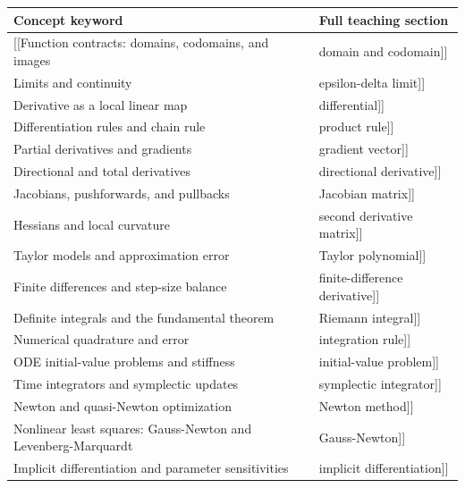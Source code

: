 {\def\LTcaptype{none} %
\begin{longtable}[]{@{}
  >{\raggedright\arraybackslash}p{}
  >{\raggedright\arraybackslash}p{}@{}}
\toprule\noalign{}
\begin{minipage}[b]{\linewidth}\raggedright
Concept keyword
\end{minipage} & \begin{minipage}[b]{\linewidth}\raggedright
Full teaching section
\end{minipage} \\
\midrule\noalign{}
\endhead
\bottomrule\noalign{}
\endlastfoot
{[}{[}Function contracts: domains, codomains, and images & domain and codomain{]}{]} \\
{[}{[}Limits and continuity & epsilon-delta limit{]}{]} \\
{[}{[}Derivative as a local linear map & differential{]}{]} \\
{[}{[}Differentiation rules and chain rule & product rule{]}{]} \\
{[}{[}Partial derivatives and gradients & gradient vector{]}{]} \\
{[}{[}Directional and total derivatives & directional derivative{]}{]} \\
{[}{[}Jacobians, pushforwards, and pullbacks & Jacobian matrix{]}{]} \\
{[}{[}Hessians and local curvature & second derivative matrix{]}{]} \\
{[}{[}Taylor models and approximation error & Taylor polynomial{]}{]} \\
{[}{[}Finite differences and step-size balance & finite-difference derivative{]}{]} \\
{[}{[}Definite integrals and the fundamental theorem & Riemann integral{]}{]} \\
{[}{[}Numerical quadrature and error & integration rule{]}{]} \\
{[}{[}ODE initial-value problems and stiffness & initial-value problem{]}{]} \\
{[}{[}Time integrators and symplectic updates & symplectic integrator{]}{]} \\
{[}{[}Newton and quasi-Newton optimization & Newton method{]}{]} \\
{[}{[}Nonlinear least squares: Gauss-Newton and Levenberg-Marquardt & Gauss-Newton{]}{]} \\
{[}{[}Implicit differentiation and parameter sensitivities & implicit differentiation{]}{]} \\
\end{longtable}
}

